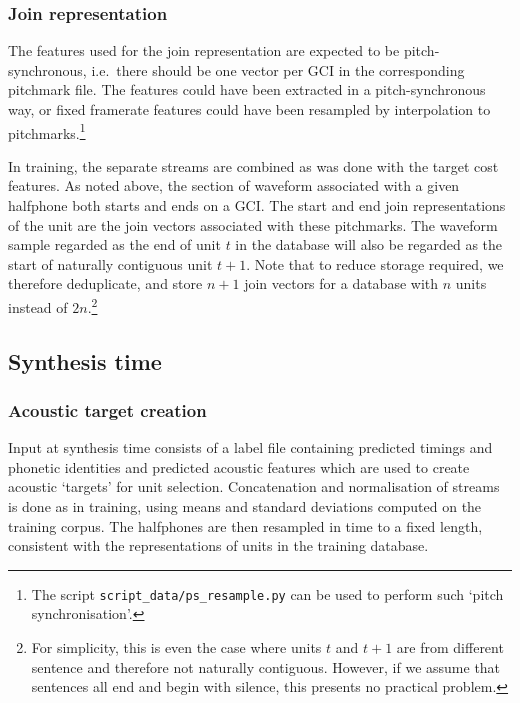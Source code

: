 \subsubsection{Join representation}

The features used for the join representation are expected to be pitch-synchronous, i.e.\ there should be one vector per GCI in the corresponding pitchmark file. The features could have been extracted in a pitch-synchronous way, or fixed framerate features could have been resampled by interpolation to pitchmarks.\footnote{The script {\tt script\_data/ps\_resample.py} can be used to perform such `pitch synchronisation'.}

In training, the separate streams are combined as was done with the target cost features. As noted above, the section of waveform associated with a given halfphone both starts and ends on a GCI. The start and end join representations of the unit are the join vectors associated with these pitchmarks.
The waveform sample regarded as the end of unit $t$ in the database will also be regarded as the start of naturally contiguous unit $t+1$.  Note that to reduce storage required, we therefore deduplicate, and store $n+1$ join  vectors for a database with $n$ units instead of $2n$.\footnote{For simplicity, this is even the case where units $t$ and $t+1$ are from different sentence and therefore not naturally contiguous. However, if we assume that sentences all end and begin with silence, this presents no practical problem.}


\subsection{Synthesis time}

\subsubsection{Acoustic target creation}
Input at synthesis time consists of a label file containing predicted timings and phonetic identities and predicted acoustic features which are used to create acoustic `targets' for unit selection.
Concatenation and normalisation of streams is done as in training, using means and standard deviations computed on the training corpus. The halfphones are then resampled in time to a fixed length, consistent with the representations of units in the training database.

